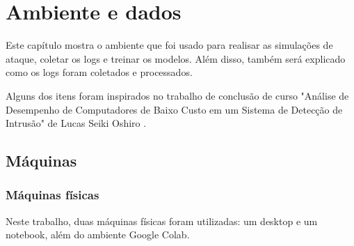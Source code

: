 
\chapter{Ambiente e dados}
\label{cap:data}

Este capítulo mostra o ambiente que foi usado para realisar as simulações de ataque, coletar os logs e treinar os modelos.
Além disso, também será explicado como os logs foram coletados e processados.

Alguns dos itens foram inspirados no trabalho de conclusão de curso "Análise de Desempenho de Computadores de Baixo Custo em um Sistema de Detecção de Intrusão" de Lucas Seiki Oshiro \cite{tcc:lucas}.


\section{Máquinas}

\subsection{Máquinas físicas}

Neste trabalho, duas máquinas físicas foram utilizadas: um desktop e um notebook, além do ambiente Google Colab. 

